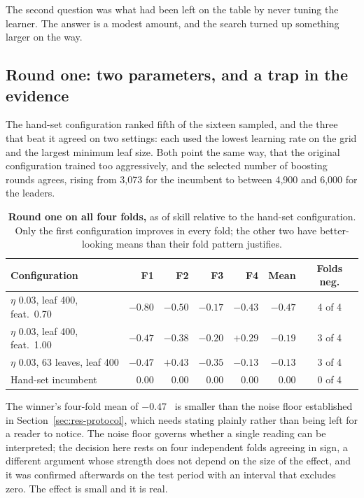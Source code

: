 The second question was what had been left on the table by never tuning the learner. The
answer is a modest amount, and the search turned up something larger on the way.

\subsection{Round one: two parameters, and a trap in the evidence}

The hand-set configuration ranked fifth of the sixteen sampled, and the three that beat it
agreed on two settings: each used the lowest learning rate on the grid and the largest
minimum leaf size. Both point the same way, that the original configuration trained too
aggressively, and the selected number of boosting rounds agrees, rising from 3,073 for the
incumbent to between 4,900 and 6,000 for the leaders.

\begin{table}[htp]
\centering
\begin{tabular}{lrrrrrc}
\toprule
{\bf Configuration} & {\bf F1} & {\bf F2} & {\bf F3} & {\bf F4} & {\bf Mean} & {\bf Folds neg.} \\
\midrule
$\eta$ 0.03, leaf 400, feat.\ 0.70 & $-0.80$ & $-0.50$ & $-0.17$ & $-0.43$ & $-0.47$ & 4 of 4 \\
$\eta$ 0.03, leaf 400, feat.\ 1.00 & $-0.47$ & $-0.38$ & $-0.20$ & $+0.29$ & $-0.19$ & 3 of 4 \\
$\eta$ 0.03, 63 leaves, leaf 400 & $-0.47$ & $+0.43$ & $-0.35$ & $-0.13$ & $-0.13$ & 3 of 4 \\
Hand-set incumbent & $0.00$ & $0.00$ & $0.00$ & $0.00$ & $0.00$ & 0 of 4 \\
\bottomrule
\end{tabular}
\caption[Round-one confirmation]{\textbf{Round one on all four folds,} as \pp{} of skill
relative to the hand-set configuration. Only the first configuration improves in every
fold; the other two have better-looking means than their fold pattern justifies.}
\label{tab:tune1}
\end{table}

The winner's four-fold mean of $-0.47$~\pp{} is smaller than the noise floor established in
Section~\ref{sec:res-protocol}, which needs stating plainly rather than being left for a
reader to notice. The noise floor governs whether a single reading can be interpreted; the
decision here rests on four independent folds agreeing in sign, a different argument whose
strength does not depend on the size of the effect, and it was confirmed afterwards on the
test period with an interval that excludes zero. The effect is small and it is real.

